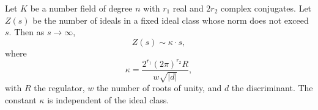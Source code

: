 Let $K$ be a number field of degree $n$ with $r_1$ real and $2r_2$ complex conjugates. Let $Z(s)$ be the number of ideals in a fixed ideal class whose norm does not exceed $s$. Then as $s \to \infty$,
$$Z(s) \sim \kappa \cdot s,$$
where
$$\kappa = \frac{2^{r_1}(2\pi)^{r_2} R}{w\sqrt{|d|}},$$
with $R$ the regulator, $w$ the number of roots of unity, and $d$ the discriminant. The constant $\kappa$ is independent of the ideal class.
